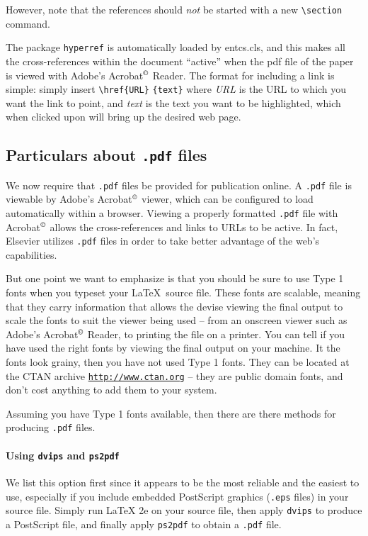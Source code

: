 \documentclass{entcs} \usepackage{entcsmacro}
\begin{document}
However, note that the references should \emph{not} be started with a
new \verb+\section+ command.

The package \texttt{hyperref} is automatically loaded by entcs.cls,
and this makes all the cross-references within the document ``active''
when the pdf file of the paper is viewed with Adobe's Acrobat$^{\tiny
  \copyright}$ Reader.  The format for including a link is simple:
simply insert \verb+\href{URL}+ \verb+{text}+ where \emph{URL} is the
URL to which you want the link to point, and \emph{text} is the text
you want to be highlighted, which when clicked upon will bring up the
desired web page.

\subsection{Particulars about {\normalshape \texttt{.pdf} files}}
We now require that \texttt{.pdf} files be provided for publication
online. A \texttt{.pdf} file is viewable by Adobe's Acrobat$^{\tiny
  \copyright}$ viewer, which can be configured to load automatically
within a browser. Viewing a properly formatted \texttt{.pdf} file with
Acrobat$^{\tiny \copyright}$ allows the cross-references and links to
URLs to be active. In fact, Elsevier utilizes \texttt{.pdf} files in
order to take better advantage of the web's capabilities.  

But one point we want to emphasize is that you should be sure to use
Type 1 fonts when you typeset your \LaTeX\ source file. These fonts
are scalable, meaning that they carry information that allows the
devise viewing the final output to scale the fonts to suit the viewer
being used -- from an onscreen viewer such as Adobe's Acrobat$^{\tiny
  \copyright}$ Reader, to printing the file on a printer. You can tell
if you have used the right fonts by viewing the final output on your
machine. It the fonts look grainy, then you have not used Type 1
fonts. They can be located at the CTAN archive
\href{http://www.ctan.org}{\tt http://www.ctan.org} -- they are public
domain fonts, and don't cost anything to add them to your system.

Assuming you have Type 1 fonts available, then there are there methods
for producing \texttt{.pdf} files.

\paragraph{Using \texttt{dvips} and \texttt{ps2pdf}}
We list this option first since it appears to be the most reliable and
the easiest to use, especially if you include embedded PostScript
graphics (\texttt{.eps} files) in your source file. Simply run \LaTeX
2e on your source file, then apply \texttt{dvips} to produce a
PostScript file, and finally apply \texttt{ps2pdf} to obtain a
\texttt{.pdf} file. 
\end{document}
